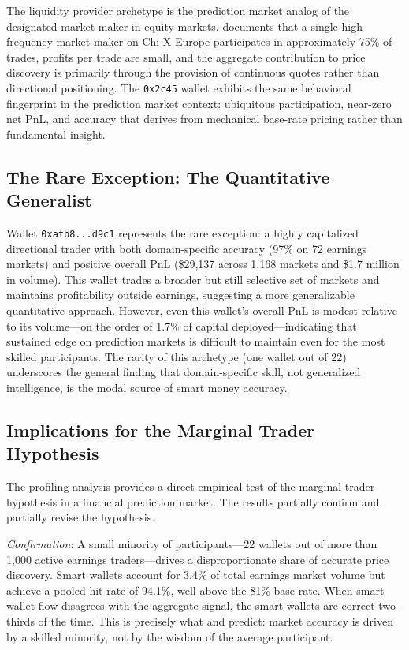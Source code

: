 \documentclass[11pt]{article}
\begin{document}
The liquidity provider archetype is the prediction market analog of the designated market maker in equity markets. \citet{menkveld2013high} documents that a single high-frequency market maker on Chi-X Europe participates in approximately 75\% of trades, profits per trade are small, and the aggregate contribution to price discovery is primarily through the provision of continuous quotes rather than directional positioning. The \texttt{0x2c45} wallet exhibits the same behavioral fingerprint in the prediction market context: ubiquitous participation, near-zero net PnL, and accuracy that derives from mechanical base-rate pricing rather than fundamental insight.

\subsection{The Rare Exception: The Quantitative Generalist}

Wallet \texttt{0xafb8...d9c1} represents the rare exception: a highly capitalized directional trader with both domain-specific accuracy (97\% on 72 earnings markets) and positive overall PnL (\$29,137 across 1,168 markets and \$1.7 million in volume). This wallet trades a broader but still selective set of markets and maintains profitability outside earnings, suggesting a more generalizable quantitative approach. However, even this wallet's overall PnL is modest relative to its volume---on the order of 1.7\% of capital deployed---indicating that sustained edge on prediction markets is difficult to maintain even for the most skilled participants. The rarity of this archetype (one wallet out of 22) underscores the general finding that domain-specific skill, not generalized intelligence, is the modal source of smart money accuracy.

\subsection{Implications for the Marginal Trader Hypothesis}

The profiling analysis provides a direct empirical test of the marginal trader hypothesis in a financial prediction market. The results partially confirm and partially revise the hypothesis.

\textit{Confirmation}: A small minority of participants---22 wallets out of more than 1,000 active earnings traders---drives a disproportionate share of accurate price discovery. Smart wallets account for 3.4\% of total earnings market volume but achieve a pooled hit rate of 94.1\%, well above the 81\% base rate. When smart wallet flow disagrees with the aggregate signal, the smart wallets are correct two-thirds of the time. This is precisely what \citet{forsythe1992anatomy} and \citet{rothschild2016trading} predict: market accuracy is driven by a skilled minority, not by the wisdom of the average participant.
\end{document}
